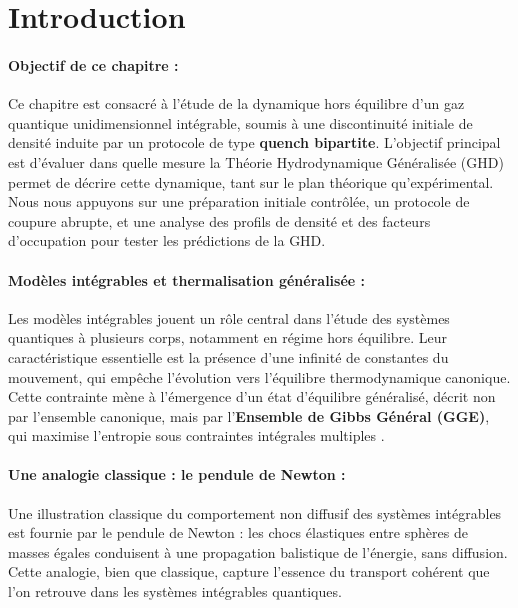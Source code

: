 
\section*{Introduction}


\paragraph{Objectif de ce chapitre :}
Ce chapitre est consacré à l’étude de la dynamique hors équilibre d’un gaz quantique unidimensionnel intégrable, soumis à une discontinuité initiale de densité induite par un protocole de type {\bf quench bipartite}. L’objectif principal est d’évaluer dans quelle mesure la Théorie Hydrodynamique Généralisée (GHD) permet de décrire cette dynamique, tant sur le plan théorique qu’expérimental. Nous nous appuyons sur une préparation initiale contrôlée, un protocole de coupure abrupte, et une analyse des profils de densité et des facteurs d’occupation pour tester les prédictions de la GHD.

\paragraph{Modèles intégrables et thermalisation généralisée :}
Les modèles intégrables jouent un rôle central dans l’étude des systèmes quantiques à plusieurs corps, notamment en régime hors équilibre. Leur caractéristique essentielle est la présence d’une infinité de constantes du mouvement, qui empêche l’évolution vers l’équilibre thermodynamique canonique. Cette contrainte mène à l’émergence d’un état d’équilibre généralisé, décrit non par l’ensemble canonique, mais par l’{\bf Ensemble de Gibbs Général (GGE)}, qui maximise l’entropie sous contraintes intégrales multiples .

\paragraph{Une analogie classique : le pendule de Newton :}
Une illustration classique du comportement non diffusif des systèmes intégrables est fournie par le pendule de Newton : les chocs élastiques entre sphères de masses égales conduisent à une propagation balistique de l’énergie, sans diffusion. Cette analogie, bien que classique, capture l’essence du transport cohérent que l’on retrouve dans les systèmes intégrables quantiques.

